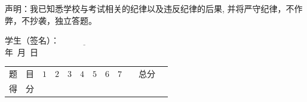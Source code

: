 \begin{center}

\end{center}
\qquad 声明：我已知悉学校与考试相关的纪律以及违反纪律的后果, 
并将严守纪律，不作弊，不抄袭，独立答题。
\begin{flushright}
    学生（签名）：$\underline{\qquad\qquad\qquad}$\\
    年\qquad\ 月\qquad\ 日\quad\ 
\end{flushright}
\begin{table}
    \begin{tabular}{|c|c|c|c|}
        题\ \ 目 &\quad$1$\quad&\quad$2$\quad&\quad$3$\quad&\quad$4$\quad&\quad$5$\quad&\quad$6$\quad&\quad$7$\quad&\ \ 总分\ \ \\
        得\ \ 分 & & & & & & & & 
    \end{tabular}
\end{table}

